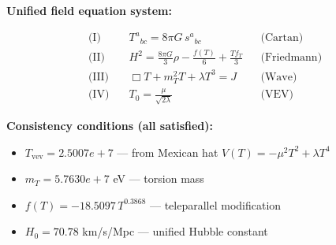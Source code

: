 
\textbf{Unified field equation system:}

\begin{align}
  \text{(I)} \quad & T^a{}_{bc} = 8\pi G \, s^a{}_{bc} && \text{(Cartan)} \\
  \text{(II)} \quad & H^2 = \frac{8\pi G}{3}\rho - \frac{f(T)}{6} + \frac{Tf_T}{3} && \text{(Friedmann)} \\
  \text{(III)} \quad & \Box T + m_T^2 T + \lambda T^3 = J && \text{(Wave)} \\
  \text{(IV)} \quad & T_0 = \frac{\mu}{\sqrt{2\lambda}} && \text{(VEV)}
\end{align}

\textbf{Consistency conditions (all satisfied):}
\begin{itemize}
  \item $T_{\text{vev}} = 2.5007e+7$ — from Mexican hat $V(T) = -\mu^2 T^2 + \lambda T^4$
  \item $m_T = 5.7630e+7$ eV — torsion mass
  \item $f(T) = -18.5097 \, T^{0.3868}$ — teleparallel modification
  \item $H_0 = 70.78$ km/s/Mpc — unified Hubble constant
\end{itemize}